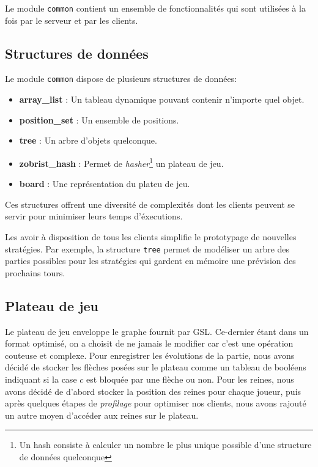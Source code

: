 Le module \verb|common| contient un ensemble de fonctionnalités qui sont 
utilisées à la fois par le serveur et par les clients. 

\subsection{Structures de données}
Le module \verb|common| dispose de plusieurs structures de données:
\begin{itemize}
    \item \textbf{array\_list} : Un tableau dynamique pouvant contenir n'importe quel objet.
    \item \textbf{position\_set} : Un ensemble de positions.
    \item \textbf{tree} : Un arbre d'objets quelconque.
    \item \textbf{zobrist\_hash} : Permet de \textit{hasher}\footnote{Un hash consiste à calculer un nombre le plus unique possible d'une structure de données quelconque} un plateau de jeu.
    \item \textbf{board} : Une représentation du plateu de jeu.
\end{itemize}

Ces structures offrent une diversité de complexités dont les clients 
peuvent se servir pour minimiser leurs temps d'éxecutions.

Les avoir à disposition de tous les clients simplifie le prototypage de nouvelles stratégies.
Par exemple, la structure \verb|tree| permet de modéliser un arbre des parties possibles pour les 
stratégies qui gardent en mémoire une prévision des prochains tours.

\subsection{Plateau de jeu}
Le plateau de jeu enveloppe le graphe fournit par GSL.
Ce-dernier étant dans un format optimisé, on a choisit de ne jamais 
le modifier car c'est une opération couteuse et complexe. Pour 
enregistrer les évolutions de la partie, nous avons décidé de stocker les
flèches posées sur le plateau comme un tableau de booléens indiquant si la case $c$ est bloquée par une flèche ou non.
Pour les reines, nous avons décidé de d'abord stocker la position des reines pour chaque joueur,
puis après quelques étapes de \emph{profilage} pour optimiser nos clients, nous avons rajouté
un autre moyen d'accéder aux reines sur le plateau.